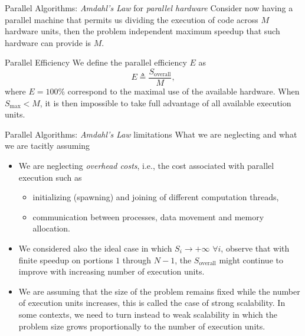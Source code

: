 \documentclass[xcolor={svgnames,usenames}]{beamer}
\begin{document}
\begin{frame}{Parallel Algorithms: \emph{Amdahl's Law} for \emph{parallel hardware}}
 Consider now having a parallel machine that permits us dividing the execution of code across $M$ hardware units, then the problem independent maximum speedup that such hardware can provide is $M$.
 \begin{block}{Parallel Efficiency}
 We define the parallel efficiency $E$ as
 \begin{equation*}
 	E \triangleq \frac{S_{\text{overall}}}{M},
 \end{equation*}
 where $E = 100\%$ correspond to the maximal use of the available hardware. When $S_{\text{max}} < M$, it is then impossible to take full advantage of all available execution units.
 \end{block}

 
\end{frame}

\begin{frame}{Parallel Algorithms: \emph{Amdahl's Law} limitations}
What we are neglecting and what we are tacitly assuming
\begin{itemize}
	\item We are neglecting \emph{overhead costs}, i.e., the cost associated with parallel execution such as
	\begin{itemize}
		\item initializing (spawning) and joining of different computation threads,
		\item communication between processes, data movement and memory allocation.
	\end{itemize}
	\item We considered also the ideal case in which $S_i \rightarrow +\infty$ $\forall i$, observe that with finite speedup on portions $1$ through $N-1$, the $S_{\text{overall}}$ might continue to improve with increasing number of execution units.
	\item We are assuming that the size of the problem remains fixed while the number of execution units increases, this is called the case of \alert{strong scalability}. In some contexts, we need to turn instead to \alert{weak scalability} in which the problem size grows proportionally to the number of execution units.
\end{itemize}
\end{frame}
\end{document}
